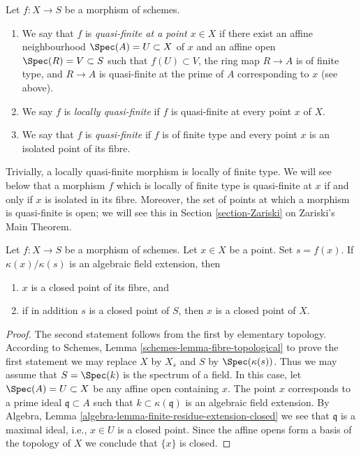 \begin{definition}
\label{definition-quasi-finite}
\begin{reference}
\cite[II Definition 6.2.3]{EGA}
\end{reference}
Let $f : X \to S$ be a morphism of schemes.
\begin{enumerate}
\item We say that $f$ is {\it quasi-finite at a point $x \in X$}
if there exist an affine neighbourhood $\Spec(A) = U \subset X$
of $x$ and an affine open $\Spec(R) = V \subset S$ such that
$f(U) \subset V$, the ring map $R \to A$ is of finite type,
and $R \to A$ is quasi-finite at the prime of $A$ corresponding to $x$
(see above).
\item We say $f$ is {\it locally quasi-finite} if $f$ is
quasi-finite at every point $x$ of $X$.
\item We say that $f$ is {\it quasi-finite} if $f$ is of finite type
and every point $x$ is an isolated point of its fibre.
\end{enumerate}
\end{definition}

\noindent
Trivially, a locally quasi-finite morphism is locally of finite type.
We will see below that a morphism $f$ which is locally of finite type
is quasi-finite at $x$ if and only if $x$ is isolated in its fibre.
Moreover, the set of points at which a morphism is quasi-finite is open;
we will see this in Section \ref{section-Zariski} on Zariski's Main Theorem.

\begin{lemma}
\label{lemma-algebraic-residue-field-extension-closed-point-fibre}
Let $f : X \to S$ be a morphism of schemes.
Let $x \in X$ be a point. Set $s = f(x)$.
If $\kappa(x)/\kappa(s)$
is an algebraic field extension, then
\begin{enumerate}
\item $x$ is a closed point of its fibre, and
\item if in addition $s$ is a closed point of $S$, then
$x$ is a closed point of $X$.
\end{enumerate}
\end{lemma}

\begin{proof}
The second statement follows from the first by elementary topology.
According to Schemes, Lemma \ref{schemes-lemma-fibre-topological}
to prove the first statement
we may replace $X$ by $X_s$ and $S$ by $\Spec(\kappa(s))$.
Thus we may assume that $S = \Spec(k)$ is the spectrum of a field.
In this case, let $\Spec(A) = U \subset X$ be any affine open
containing $x$. The point $x$ corresponds to a prime ideal
$\mathfrak q \subset A$ such that $k \subset \kappa(\mathfrak q)$
is an algebraic field extension. By
Algebra, Lemma \ref{algebra-lemma-finite-residue-extension-closed}
we see that $\mathfrak q$ is a maximal ideal, i.e., $x \in U$ is a
closed point. Since the affine opens form
a basis of the topology of $X$ we conclude that $\{x\}$ is closed.
\end{proof}

